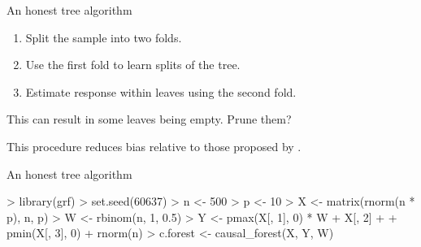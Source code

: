 \documentclass[xcolor={table}, handout]{beamer}
\begin{document}
\begin{frame}{An honest tree algorithm}

\begin{enumerate}
\item Split the sample into two folds. \pause
\item Use the first fold to learn splits of the tree. \pause
\item Estimate response within leaves using the second fold. \pause
\end{enumerate}

\begin{wideitemize}
\item This can result in some leaves being empty. \pause Prune them? \pause
\item This procedure reduces bias relative to those proposed by \cite{breiman2001random}. 
\end{wideitemize}

\end{frame}



\begin{frame}[fragile]{An honest tree algorithm}

\begin{Schunk}
\begin{Sinput}
> library(grf)
> set.seed(60637)
> n <- 500
> p <- 10
> X <- matrix(rnorm(n * p), n, p)
> W <- rbinom(n, 1, 0.5)
> Y <- pmax(X[, 1], 0) * W + X[, 2] + 
+   pmin(X[, 3], 0) + rnorm(n)
> c.forest <- causal_forest(X, Y, W)
\end{Sinput}
\end{Schunk}



\end{frame}


\end{document}
